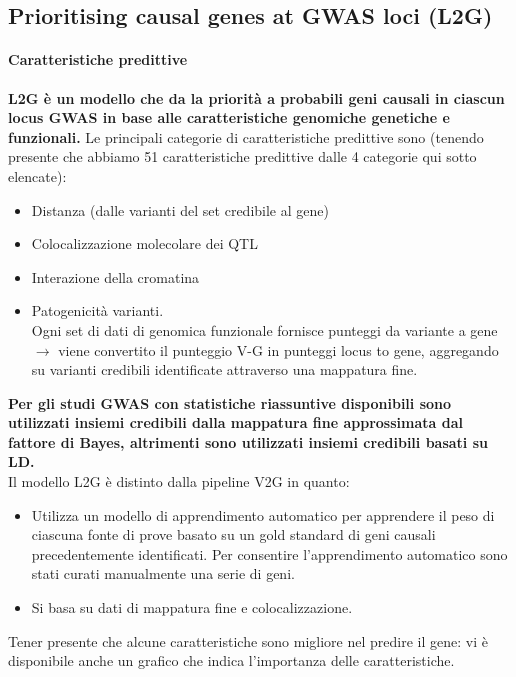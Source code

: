 \documentclass{article}
\begin{document}
\subsection{Prioritising causal genes at GWAS loci (L2G)}
\paragraph{Caratteristiche predittive} \textbf{L2G è un modello che da la priorità a probabili geni causali in ciascun locus GWAS in base alle caratteristiche genomiche genetiche e funzionali.} Le principali categorie di caratteristiche predittive sono (tenendo presente che abbiamo 51 caratteristiche predittive dalle 4 categorie qui sotto elencate):
\begin{itemize}
    \item Distanza (dalle varianti del set credibile al gene)
    \item Colocalizzazione molecolare dei QTL
    \item Interazione della cromatina
    \item Patogenicità varianti.\\
    Ogni set di dati di genomica funzionale fornisce punteggi da variante a gene $\rightarrow$ viene convertito il punteggio V-G in punteggi locus to gene, aggregando su varianti credibili identificate attraverso una mappatura fine.
\end{itemize}
\textbf{Per gli studi GWAS con statistiche riassuntive disponibili sono utilizzati insiemi credibili dalla mappatura fine approssimata dal fattore di Bayes, altrimenti sono utilizzati insiemi credibili basati su LD.}\\
Il modello L2G è distinto dalla pipeline V2G in quanto:
\begin{itemize}
    \item Utilizza un modello di apprendimento automatico per apprendere il peso di ciascuna fonte di prove basato su un gold standard di geni causali precedentemente identificati.
    Per consentire l'apprendimento automatico sono stati curati manualmente una serie di geni.
    \item Si basa su dati di mappatura fine e colocalizzazione.
\end{itemize}
Tener presente che alcune caratteristiche sono migliore nel predire il gene: vi è disponibile anche un grafico che indica l'importanza delle caratteristiche.
\end{document}
